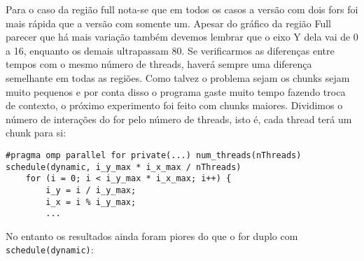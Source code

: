 \documentclass[12pt]{article}
\newcommand{\code}[1]{\texttt{#1}}
\begin{document}
\begin{figure}[H]
\end{figure}

\begin{figure}[H]
\end{figure}

\begin{figure}[H]
\end{figure}

Para o caso da região full nota-se que em todos os casos a versão com dois fors foi mais rápida que a versão com somente um. Apesar do gráfico da região Full parecer que há mais variação também devemos lembrar que o eixo Y dela vai de 0 a 16, enquanto os demais ultrapassam 80. Se verificarmos as diferenças entre tempos com o mesmo número de threads, haverá sempre uma diferença semelhante em todas as regiões.
Como talvez o problema sejam os chunks sejam muito pequenos e por conta disso o programa gaste muito tempo fazendo troca de contexto, o próximo experimento foi feito com chunks maiores. Dividimos o número de interações do for pelo número de threads, isto é, cada thread terá um chunk para si:
\begin{lstlisting}[style=CStyle]
    #pragma omp parallel for private(...) num_threads(nThreads) schedule(dynamic, i_y_max * i_x_max / nThreads)
    for (i = 0; i < i_y_max * i_x_max; i++) {
        i_y = i / i_y_max;
        i_x = i % i_y_max;
        ...
\end{lstlisting}

No entanto os resultados ainda foram piores do que o for duplo com \code{schedule(dynamic)}:

\begin{figure}[H]
\end{figure}

\begin{figure}[H]
\end{figure}

\begin{figure}[H]
\end{figure}
\end{document}
